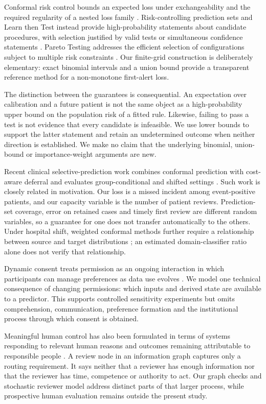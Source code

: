Conformal risk control bounds an expected loss under exchangeability and the required regularity of a nested loss family \citep{crc}. Risk-controlling prediction sets and Learn then Test instead provide high-probability statements about candidate procedures, with selection justified by valid tests or simultaneous confidence statements \citep{rcps,ltt}. Pareto Testing addresses the efficient selection of configurations subject to multiple risk constraints \citep{pareto}. Our finite-grid construction is deliberately elementary: exact binomial intervals and a union bound provide a transparent reference method for a non-monotone first-alert loss.

The distinction between the guarantees is consequential. An expectation over calibration and a future patient is not the same object as a high-probability upper bound on the population risk of a fitted rule. Likewise, failing to pass a test is not evidence that every candidate is infeasible. We use lower bounds to support the latter statement and retain an undetermined outcome when neither direction is established. We make no claim that the underlying binomial, union-bound or importance-weight arguments are new.

Recent clinical selective-prediction work combines conformal prediction with cost-aware deferral and evaluates group-conditional and shifted settings \citep{kwon2026}. Such work is closely related in motivation. Our loss is a missed incident among event-positive patients, and our capacity variable is the number of patient reviews. Prediction-set coverage, error on retained cases and timely first review are different random variables, so a guarantee for one does not transfer automatically to the others. Under hospital shift, weighted conformal methods further require a relationship between source and target distributions \citep{weighted}; an estimated domain-classifier ratio alone does not verify that relationship.



Dynamic consent treats permission as an ongoing interaction in which participants can manage preferences as data use evolves \citep{kaye2014}. We model one technical consequence of changing permissions: which inputs and derived state are available to a predictor. This supports controlled sensitivity experiments but omits comprehension, communication, preference formation and the institutional process through which consent is obtained.

Meaningful human control has also been formulated in terms of systems responding to relevant human reasons and outcomes remaining attributable to responsible people \citep{santoni2018}. A review node in an information graph captures only a routing requirement. It says neither that a reviewer has enough information nor that the reviewer has time, competence or authority to act. Our graph checks and stochastic reviewer model address distinct parts of that larger process, while prospective human evaluation remains outside the present study.
